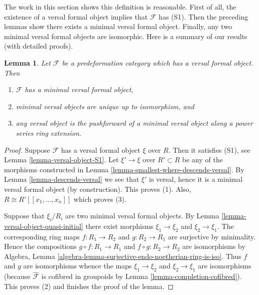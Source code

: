 \documentclass{stacks-project}
\theoremstyle{plain}
\newtheorem{lemma}[subsection]{Lemma}
\theoremstyle{definition}
\theoremstyle{remark}
\numberwithin{equation}{subsection}
\begin{document}
\noindent
The work in this section shows this definition is reasonable.
First of all, the existence of a versal formal object implies that
$\mathcal{F}$ has (S1). Then the preceding lemmas
show there exists a minimal versal formal object. Finally, any
two minimal versal formal objects are isomorphic. Here is a summary
of our results (with detailed proofs).

\begin{lemma}
\label{lemma-minimal-versal}
Let $\mathcal{F}$ be a predeformation category which
has a versal formal object. Then
\begin{enumerate}
\item $\mathcal{F}$ has a minimal versal formal object,
\item minimal versal objects are unique up to isomorphism, and
\item any versal object is the pushforward of a minimal versal
object along a power series ring extension.
\end{enumerate}
\end{lemma}

\begin{proof}
Suppose $\mathcal{F}$ has a versal formal object $\xi$ over $R$.
Then it satisfies (S1), see
Lemma \ref{lemma-versal-object-S1}.
Let $\xi' \to \xi$ over $R' \subset R$ be any of the morphisms constructed in
Lemma \ref{lemma-smallest-where-descends-versal}.
By
Lemma \ref{lemma-descends-versal}
we see that $\xi'$ is versal, hence it is a minimal versal formal
object (by construction). This proves (1).
Also, $R \cong R'[[x_1, \ldots, x_n]]$ which proves (3).

\medskip\noindent
Suppose that $\xi_i/R_i$ are two minimal versal formal objects. By
Lemma \ref{lemma-versal-object-quasi-initial}
there exist morphisms $\xi_1 \to \xi_2$ and $\xi_2 \to \xi_1$.
The corresponding ring maps $f : R_1 \to R_2$ and $g : R_2 \to R_1$
are surjective by minimality. Hence the compositions
$g \circ f : R_1 \to R_1$ and $f \circ g : R_2 \to R_2$ are
isomorphisms by
Algebra, Lemma \ref{algebra-lemma-surjective-endo-noetherian-ring-is-iso}.
Thus $f$ and $g$ are isomorphisms whence the maps
$\xi_1 \to \xi_2$ and $\xi_2 \to \xi_1$ are isomorphisms
(because $\widehat{\mathcal{F}}$ is cofibred in groupoids by
Lemma \ref{lemma-completion-cofibred}). This proves (2) and
finishes the proof of the lemma.
\end{proof}
\end{document}
